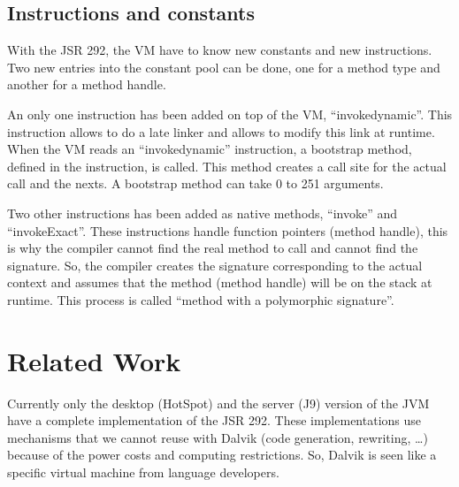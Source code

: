 \documentclass{sigplanconf}
\def \Jsr{JSR\xspace}
\def \JSR{\Jsr 292\xspace}
\def \VM{VM\xspace}
\begin{document}
% 


    \subsection{Instructions and constants}
      With the \JSR, the \VM have to know new constants and new instructions.
      Two new entries into the constant pool can be done, one for a method type and another for a method handle.

      An only one instruction has been added on top of the \VM, ``invokedynamic''.
      This instruction allows to do a late linker and allows to modify this link at runtime.
      When the \VM reads an ``invokedynamic'' instruction, a bootstrap method, defined in the instruction, is called.
      This method creates a call site for the actual call and the nexts.
      A bootstrap method can take 0 to 251 arguments.

      Two other instructions has been added as native methods, ``invoke'' and ``invokeExact''.
      These instructions handle function pointers (method handle),
      this is why the compiler cannot find the real method to call and cannot find the signature.
      So, the compiler creates the signature corresponding to the actual context
      and assumes that the method (method handle) will be on the stack at runtime.
      This process is called ``method with a polymorphic signature''.

\section{Related Work}

  Currently only the desktop (HotSpot) and the server (J9) version of the JVM have a complete implementation of the JSR 292.
  These implementations use mechanisms that we cannot reuse with Dalvik (code generation, rewriting, \dots)
  because of the power costs and computing restrictions.
  So, Dalvik is seen like a specific virtual machine from language developers.
    
\end{document}
